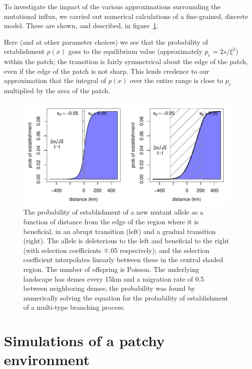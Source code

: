 \documentclass{article}
\begin{document}
To investigate the impact of the various approximations surrounding the mutational influx,
we carried out numerical calculations of a fine-grained, discrete model.
These are shown, and described, in figure~\ref{fig:prob_estab_calcs}.

Here (and at other parameter choices) we see that the probability of establishment $p(x)$ goes to the equilibrium value
(approximately $p_e = 2s/\xi^2$) within the patch;
the transition is fairly symmetrical about the edge of the patch, even if the edge of the patch is not sharp.
This lends credence to our approximation that the integral of $p(x)$ over the entire range
is close to $p_e$ multiplied by the area of the patch.

\begin{figure}[ht!]
    \begin{center}
        \includegraphics{prob-establishment}
    \end{center}
    \label{fig:prob_estab_calcs}
    \caption{The probability of establishment of a new mutant allele as a function of distance from the edge of the region where it is beneficial,
    in an abrupt transition (left) and a gradual transition (right).
    The allele is deleterious to the left and beneficial to the right (with selection coefficients $\mp .05$ respecively);
    and the selection coefficient interpolates linearly between these in the central shaded region.
    The number of offspring is Poisson.
    The underlying landscape has demes every 15km and a migration rate of 0.5 between neighboring demes;
    the probability was found by numerically solving the equation for the probability of establishment of a multi-type branching process.
    }
\end{figure}


\section{Simulations of a patchy environment}
\label{apx:patchy_sims}
\end{document}
